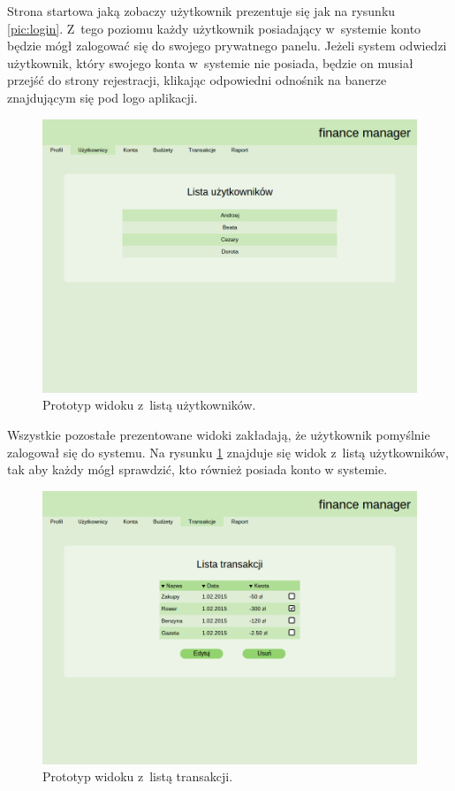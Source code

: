 Strona startowa jaką zobaczy użytkownik prezentuje się jak na rysunku \ref{pic:login}. Z~tego poziomu każdy użytkownik
posiadający w~systemie konto będzie mógł zalogować się do swojego prywatnego panelu. Jeżeli system odwiedzi użytkownik,
który swojego konta w~systemie nie posiada, będzie on musiał przejść do strony rejestracji, klikając odpowiedni odnośnik
na banerze znajdującym się pod logo aplikacji.


\begin{figure}[H]
  \centering
  \includegraphics[width=\textwidth]{images/ui-user-list.png}
  \caption{Prototyp widoku z~listą użytkowników.}
  \label{pic:user_list}
\end{figure}

Wszystkie pozostałe prezentowane widoki zakładają, że użytkownik pomyślnie zalogował się do systemu. Na rysunku
\ref{pic:user_list} znajduje się widok z~listą użytkowników, tak aby każdy mógł sprawdzić, kto również posiada konto w
systemie.

\begin{figure}[H]
  \centering
  \includegraphics[width=\textwidth]{images/ui-trans.png}
  \caption{Prototyp widoku z~listą transakcji.}
  \label{pic:trans}
\end{figure}


